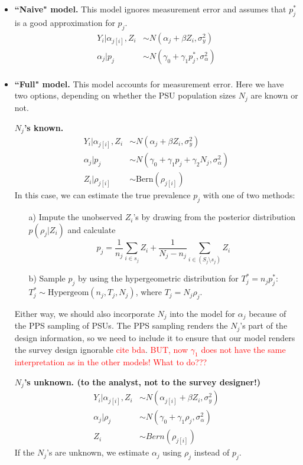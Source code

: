 \documentclass[10pt,a4paper]{article}
\newcommand*{\red}{\textcolor{red}}
\begin{document}
\begin{itemize}
	\item \textbf{``Naive" model.} This model ignores measurement error and assumes that $p^*_j$ is a good approximation for $p_j$.
		\begin{align*}
			Y_i | \alpha_{j[i]}, Z_i &\sim N(\alpha_j + \beta Z_i, \sigma_y^2) \\
			\alpha_j | p_j &\sim N(\gamma_0 + \gamma_1 p^*_j, \sigma_{\alpha}^2) \\
		\end{align*}
	\item \textbf{``Full" model.} This model accounts for measurement error. Here we have two options, depending on whether the PSU population sizes $N_j$ are known or not.
	
		\textbf{$N_j$'s known.}
			\begin{align*}
				Y_i | \alpha_{j[i]}, Z_i &\sim N(\alpha_j + \beta Z_i, \sigma_y^2) \\
				\alpha_j | p_j &\sim N(\gamma_0 + \gamma_1 p_j + \gamma_2 N_j, \sigma_{\alpha}^2) \\
				Z_i | \rho_{j[i]} &\sim \mathrm{Bern}(\rho_{j[i]})
			\end{align*}	
			In this case, we can estimate the true prevalence $p_j$ with one of two methods:
			\begin{itemize}
				\item[a)] Impute the unobserved $Z_i$'s by drawing from the posterior distribution $p(\rho_j | Z_i)$ and calculate
					\[
						p_j = \frac{1}{n_j} \sum_{i \in s_j} Z_i + \frac{1}{N_j - n_j} \sum_{i \in (S_j \setminus s_j)} Z_i
					\]
				\item[b)] Sample $p_j$ by using the hypergeometric distribution for $T^*_j = n_j p^*_j$: $T^*_j \sim \mathrm{Hypergeom}(n_j, T_j, N_j)$, where $T_j = N_j \rho_j$.
			\end{itemize}
			Either way, we should also incorporate $N_j$ into the model for $\alpha_j$ because of the PPS sampling of PSUs. The PPS sampling renders the $N_j$'s part of the design information, so we need to include it to ensure that our model renders the survey design ignorable \red{cite bda}. \red{BUT, now $\gamma_1$ does not have the same interpretation as in the other models! What to do???}
	
		\textbf{$N_j$'s unknown. (to the analyst, not to the survey designer!)} 
			\begin{align*}
				Y_i | \alpha_{j[i]}, Z_i &\sim N(\alpha_{j[i]}	 + \beta Z_i, \sigma_y^2) \\
				\alpha_j | \rho_j &\sim N(\gamma_0 + \gamma_1 \rho_j, \sigma_{\alpha}^2) \\
				Z_i &\sim Bern(\rho_{j[i]})
			\end{align*}
			If the $N_j$'s are unknown, we estimate $\alpha_j$ using $\rho_j$ instead of $p_j$.
\end{itemize}
\end{document}
